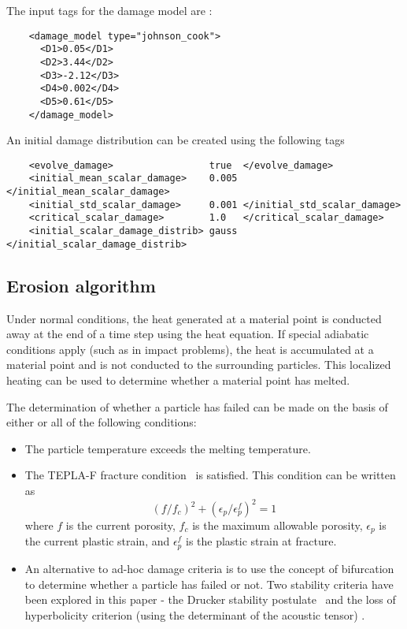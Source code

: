   The input tags for the damage model are :
  \begin{verbatim}
    <damage_model type="johnson_cook">
      <D1>0.05</D1>
      <D2>3.44</D2>
      <D3>-2.12</D3>
      <D4>0.002</D4>
      <D5>0.61</D5>
    </damage_model>
  \end{verbatim}

  An initial damage distribution can be created using the following tags
  \begin{verbatim}
    <evolve_damage>                 true  </evolve_damage>
    <initial_mean_scalar_damage>    0.005  </initial_mean_scalar_damage>
    <initial_std_scalar_damage>     0.001 </initial_std_scalar_damage>
    <critical_scalar_damage>        1.0   </critical_scalar_damage>
    <initial_scalar_damage_distrib> gauss </initial_scalar_damage_distrib>
  \end{verbatim}

  \subsection{Erosion algorithm}
  Under normal conditions, the heat generated at a material point is conducted 
  away at the end of a time step using the heat equation.  If special adiabatic 
  conditions apply (such as in impact problems), the heat is accumulated at a 
  material point and is not conducted to the surrounding particles.  This 
  localized heating can be used to determine whether a material point has
  melted.

  The determination of whether a particle has failed can be made on the 
  basis of either or all of the following conditions:
  \begin{itemize}
    \item The particle temperature exceeds the melting temperature.
    \item The TEPLA-F fracture condition~\cite{Johnson88} is satisfied.
       This condition can be written as
       \begin{equation}
         (f/f_c)^2 + (\epsilon_p/\epsilon_p^f)^2 = 1
       \end{equation}
       where $f$ is the current porosity, $f_c$ is the maximum 
       allowable porosity, $\epsilon_p$ is the current plastic strain, and
       $\epsilon_p^f$ is the plastic strain at fracture.
    \item An alternative to ad-hoc damage criteria is to use the concept of 
       bifurcation to determine whether a particle has failed or not.  Two
       stability criteria have been explored in this paper - the Drucker
       stability postulate~\cite{Drucker59} and the loss of hyperbolicity
       criterion (using the determinant of the acoustic tensor)
       \cite{Rudnicki75,Perzyna98}.  
  \end{itemize}

